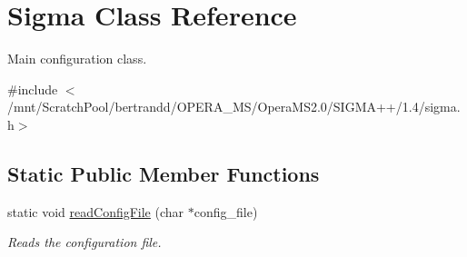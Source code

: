 \hypertarget{classSigma}{
\section{Sigma Class Reference}
\label{classSigma}
}


Main configuration class.  


{\ttfamily \#include $<$/mnt/ScratchPool/bertrandd/OPERA\_\-MS/OperaMS2.0/SIGMA++/1.4/sigma.h$>$}\subsection*{Static Public Member Functions}
\begin{DoxyCompactItemize}
\item 
static void \hyperlink{classSigma_aebecf315bb7a8fd9c55672b5d81c6385}{readConfigFile} (char $\ast$config\_\-file)
\begin{DoxyCompactList}\small\item\em Reads the configuration file. \item\end{DoxyCompactList}\end{DoxyCompactItemize}
